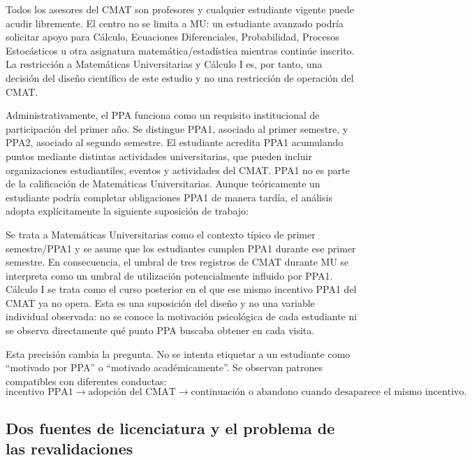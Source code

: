 Todos los asesores del CMAT son profesores y cualquier estudiante vigente puede acudir libremente. El centro no se limita a MU: un estudiante avanzado podría solicitar apoyo para Cálculo, Ecuaciones Diferenciales, Probabilidad, Procesos Estocásticos u otra asignatura matemática/estadística mientras continúe inscrito. La restricción a Matemáticas Universitarias y Cálculo I es, por tanto, una decisión del diseño científico de este estudio y no una restricción de operación del CMAT.

Administrativamente, el PPA funciona como un requisito institucional de participación del primer año. Se distingue PPA1, asociado al primer semestre, y PPA2, asociado al segundo semestre. El estudiante acredita PPA1 acumulando puntos mediante distintas actividades universitarias, que pueden incluir organizaciones estudiantiles, eventos y actividades del CMAT. PPA1 no es parte de la calificación de Matemáticas Universitarias. Aunque teóricamente un estudiante podría completar obligaciones PPA1 de manera tardía, el análisis adopta explícitamente la siguiente suposición de trabajo:

\begin{cautionbox}[title=Suposición administrativa central del capítulo]
Se trata a Matemáticas Universitarias como el contexto típico de primer semestre/PPA1 y se asume que los estudiantes cumplen PPA1 durante ese primer semestre. En consecuencia, el umbral de tres registros de CMAT durante MU se interpreta como un umbral de utilización potencialmente influido por PPA1. Cálculo I se trata como el curso posterior en el que ese mismo incentivo PPA1 del CMAT ya no opera. Esta es una suposición del diseño y no una variable individual observada: no se conoce la motivación psicológica de cada estudiante ni se observa directamente qué punto PPA buscaba obtener en cada visita.
\end{cautionbox}

Esta precisión cambia la pregunta. No se intenta etiquetar a un estudiante como ``motivado por PPA'' o ``motivado académicamente''. Se observan patrones compatibles con diferentes conductas:
\[
\text{incentivo PPA1}\longrightarrow\text{adopción del CMAT}\longrightarrow
\text{continuación o abandono cuando desaparece el mismo incentivo}.
\]

\subsection{Dos fuentes de licenciatura y el problema de las revalidaciones}

